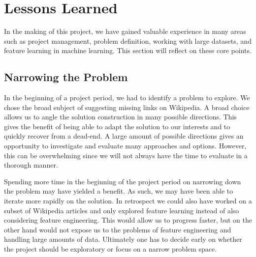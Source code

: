 \section{Lessons Learned}

In the making of this project, we have gained valuable experience in many areas such as project management, problem definition, working with large datasets, and feature learning in machine learning. This section will reflect on these core points.

\subsection{Narrowing the Problem}
In the beginning of a project period, we had to identify a problem to explore. We chose the broad subject of suggesting missing links on Wikipedia. A broad choice allows us to angle the solution construction in many possible directions. This gives the benefit of being able to adapt the solution to our interests and to quickly recover from a dead-end. A large amount of possible directions gives an opportunity to investigate and evaluate many approaches and options. However, this can be overwhelming since we will not always have the time to evaluate in a thorough manner.

Spending more time in the beginning of the project period on narrowing down the problem may have yielded a benefit. As such, we may have been able to iterate more rapidly on the solution. In retrospect we could also have worked on a subset of Wikipedia articles and only explored feature learning instead of also considering feature engineering. This would allow us to progress faster, but on the other hand would not expose us to the problems of feature engineering and handling large amounts of data. Ultimately one has to decide early on whether the project should be exploratory or focus on a narrow problem space.


